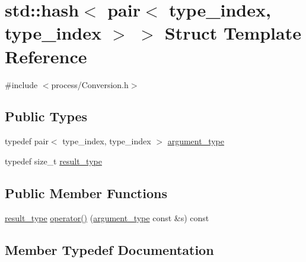 \hypertarget{structstd_1_1hash_3_01pair_3_01type__index_00_01type__index_01_4_01_4}{}\section{std\+:\+:hash$<$ pair$<$ type\+\_\+index, type\+\_\+index $>$ $>$ Struct Template Reference}
\label{structstd_1_1hash_3_01pair_3_01type__index_00_01type__index_01_4_01_4}


{\ttfamily \#include $<$process/\+Conversion.\+h$>$}

\subsection*{Public Types}
\begin{DoxyCompactItemize}
\item 
typedef pair$<$ type\+\_\+index, type\+\_\+index $>$ \hyperlink{structstd_1_1hash_3_01pair_3_01type__index_00_01type__index_01_4_01_4_aeef46cf7449a1b74dbf351437593fab1}{argument\+\_\+type}
\item 
typedef size\+\_\+t \hyperlink{structstd_1_1hash_3_01pair_3_01type__index_00_01type__index_01_4_01_4_a0735277cb1aa090649b0677112b2de8b}{result\+\_\+type}
\end{DoxyCompactItemize}
\subsection*{Public Member Functions}
\begin{DoxyCompactItemize}
\item 
\hyperlink{structstd_1_1hash_3_01pair_3_01type__index_00_01type__index_01_4_01_4_a0735277cb1aa090649b0677112b2de8b}{result\+\_\+type} \hyperlink{structstd_1_1hash_3_01pair_3_01type__index_00_01type__index_01_4_01_4_a5a1b656e49677d32fc631c6559f1f8ad}{operator()} (\hyperlink{structstd_1_1hash_3_01pair_3_01type__index_00_01type__index_01_4_01_4_aeef46cf7449a1b74dbf351437593fab1}{argument\+\_\+type} const \&s) const 
\end{DoxyCompactItemize}


\subsection{Member Typedef Documentation}
